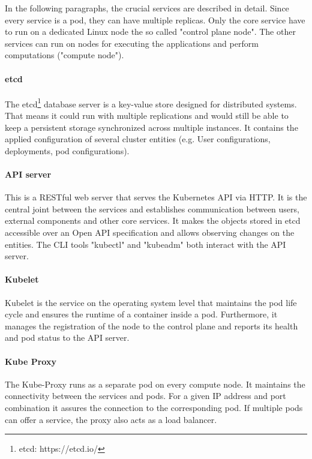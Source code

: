 In the following paragraphs, the crucial services are described in detail. Since every service is a pod, they can have multiple replicas. Only the core service have to run on a dedicated Linux node the so called "control plane node". The other services can run on nodes for executing the applications and perform computations ("compute node").

\paragraph*{etcd}
The etcd\footnote{etcd: https://etcd.io/} database server is a key-value store designed for distributed systems\cite{Luksa.2018}. That means it could run with multiple replications and would still be able to keep a persistent storage synchronized across multiple instances. It contains the applied configuration of several cluster entities (e.g. User configurations, deployments, pod configurations).

\paragraph*{API server}
This is a RESTful web server that serves the Kubernetes \ac{API} via \ac{HTTP}\cite{Kubernetes.20221024}. It is the central joint between the services and establishes communication between users, external components and other core services. It makes the objects stored in etcd accessible over an Open \ac{API} specification\cite{Luksa.2018,OpenAPIInitiative.20230210} and allows observing changes on the entities. The \ac{CLI} tools "kubectl" and "kubeadm" both interact with the \ac{API} server.

\paragraph*{Kubelet} Kubelet is the service on the operating system level that maintains the pod life cycle and ensures the runtime of a container inside a pod. Furthermore, it manages the registration of the node to the control plane and reports its health and pod status to the \ac{API} server.

\paragraph*{Kube Proxy} The Kube-Proxy runs as a separate pod on every compute node. It maintains the connectivity between the services and pods\cite{Luksa.2018}. For a given \ac{IP} address and port combination it assures the connection to the corresponding pod. If multiple pods can offer a service, the proxy also acts as a load balancer\cite{Luksa.2018}.

